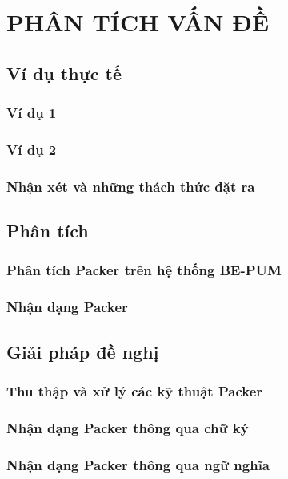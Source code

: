 
\newpage
\chapter{PHÂN TÍCH VẤN ĐỀ}

\section{Ví dụ thực tế}

\subsection{Ví dụ 1}

\subsection{Ví dụ 2}

\subsection{Nhận xét và những thách thức đặt ra}

\section{Phân tích}

\subsection {Phân tích Packer trên hệ thống BE-PUM}

\subsection {Nhận dạng Packer}

\section{Giải pháp đề nghị}

\subsection {Thu thập và xử lý các kỹ thuật Packer}

\subsection {Nhận dạng Packer thông qua chữ ký}

\subsection {Nhận dạng Packer thông qua ngữ nghĩa}

